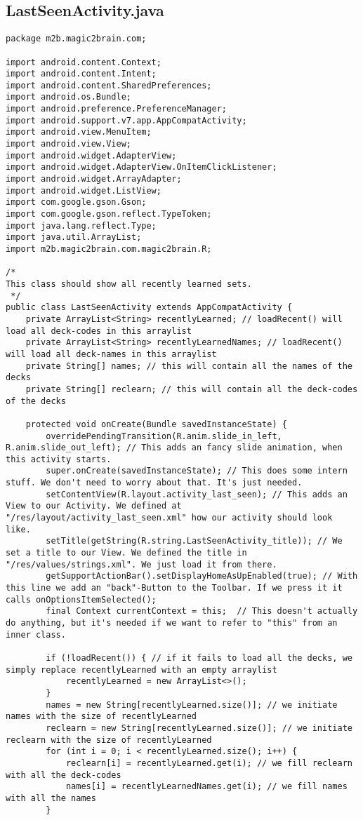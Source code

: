 \subsection*{LastSeenActivity.java}
\begin{lstlisting}
package m2b.magic2brain.com;

import android.content.Context;
import android.content.Intent;
import android.content.SharedPreferences;
import android.os.Bundle;
import android.preference.PreferenceManager;
import android.support.v7.app.AppCompatActivity;
import android.view.MenuItem;
import android.view.View;
import android.widget.AdapterView;
import android.widget.AdapterView.OnItemClickListener;
import android.widget.ArrayAdapter;
import android.widget.ListView;
import com.google.gson.Gson;
import com.google.gson.reflect.TypeToken;
import java.lang.reflect.Type;
import java.util.ArrayList;
import m2b.magic2brain.com.magic2brain.R;

/*
This class should show all recently learned sets.
 */
public class LastSeenActivity extends AppCompatActivity {
    private ArrayList<String> recentlyLearned; // loadRecent() will load all deck-codes in this arraylist
    private ArrayList<String> recentlyLearnedNames; // loadRecent() will load all deck-names in this arraylist
    private String[] names; // this will contain all the names of the decks
    private String[] reclearn; // this will contain all the deck-codes of the decks

    protected void onCreate(Bundle savedInstanceState) {
        overridePendingTransition(R.anim.slide_in_left, R.anim.slide_out_left); // This adds an fancy slide animation, when this activity starts.
        super.onCreate(savedInstanceState); // This does some intern stuff. We don't need to worry about that. It's just needed.
        setContentView(R.layout.activity_last_seen); // This adds an View to our Activity. We defined at "/res/layout/activity_last_seen.xml" how our activity should look like.
        setTitle(getString(R.string.LastSeenActivity_title)); // We set a title to our View. We defined the title in "/res/values/strings.xml". We just load it from there.
        getSupportActionBar().setDisplayHomeAsUpEnabled(true); // With this line we add an "back"-Button to the Toolbar. If we press it it calls onOptionsItemSelected();
        final Context currentContext = this;  // This doesn't actually do anything, but it's needed if we want to refer to "this" from an inner class.

        if (!loadRecent()) { // if it fails to load all the decks, we simply replace recentlyLearned with an empty arraylist
            recentlyLearned = new ArrayList<>();
        }
        names = new String[recentlyLearned.size()]; // we initiate names with the size of recentlyLearned
        reclearn = new String[recentlyLearned.size()]; // we initiate reclearn with the size of recentlyLearned
        for (int i = 0; i < recentlyLearned.size(); i++) {
            reclearn[i] = recentlyLearned.get(i); // we fill reclearn with all the deck-codes
            names[i] = recentlyLearnedNames.get(i); // we fill names with all the names
        }


\end{lstlisting}

